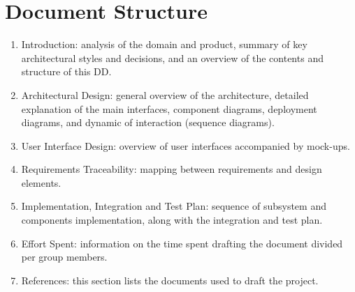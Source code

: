 \section{Document Structure}
\begin{enumerate}
    \item Introduction: analysis of the domain and product, summary of key architectural styles and decisions, and an overview of the contents and structure of this DD.
    \item Architectural Design: general overview of the architecture,  detailed explanation of the main interfaces, component diagrams, deployment diagrams, and dynamic of interaction (sequence diagrams).
    \item User Interface Design: overview of user interfaces accompanied by mock-ups.
    \item Requirements Traceability: mapping between requirements and design elements.
    \item Implementation, Integration and Test Plan: sequence of subsystem and components implementation, along with the integration and test plan.
    \item Effort Spent: information on the time spent drafting the document divided per group members.
    \item References: this section lists the documents used to draft the project.
\end{enumerate}